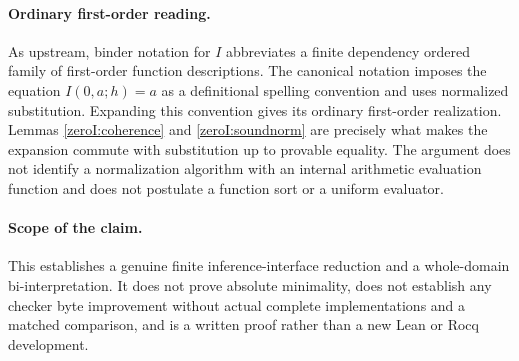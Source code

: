 \paragraph{Ordinary first-order reading.}
As upstream, binder notation for $I$ abbreviates a finite dependency
ordered family of first-order function descriptions.  The canonical
notation imposes the equation $I(0,a;h)=a$ as a definitional spelling
convention and uses normalized substitution.  Expanding this convention
gives its ordinary first-order realization.  Lemmas
\ref{zeroI:coherence} and \ref{zeroI:soundnorm} are precisely what makes
the expansion commute with substitution up to provable equality.
The argument does not identify a normalization algorithm with an
internal arithmetic evaluation function and does not postulate a
function sort or a uniform evaluator.

\paragraph{Scope of the claim.}
This establishes a genuine finite inference-interface reduction and a
whole-domain bi-interpretation.  It does not prove absolute minimality,
does not establish any checker byte improvement without actual complete
implementations and a matched comparison, and is a written proof rather
than a new Lean or Rocq development.
